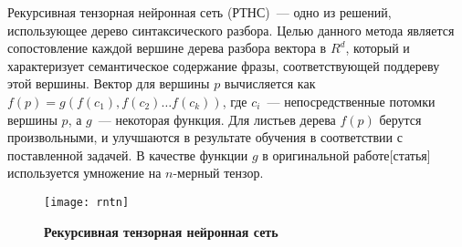 Рекурсивная тензорная нейронная сеть (РТНС)~--- одно из решений, использующее дерево синтаксического разбора. Целью данного метода является сопостовление каждой вершине дерева разбора вектора в $R^d$, который и характеризует семантическое содержание фразы, соответствующей поддереву этой вершины.
Вектор для вершины $p$ вычисляется как $f(p)=g(f(c_1), f(c_2) \dots{} f(c_k))$, где $c_i$~--- непосредственные потомки вершины $p$, а $g$~--- некоторая функция. Для листьев дерева $f(p)$ берутся произвольными, и улучшаются в результате обучения в соответствии с поставленной задачей.
В качестве функции $g$ в оригинальной работе[статья] используется умножение на $n$-мерный тензор.

\begin{figure}[h]
\texttt{[image: rntn]}
\caption{\textbf{Рекурсивная тензорная нейронная сеть}}
\label{fig:rntn}
\end{figure}
 